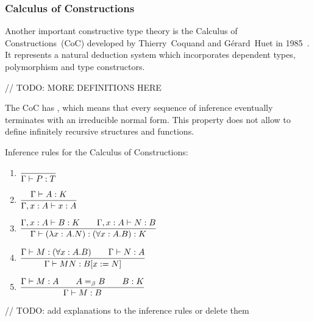 \documentclass[article]{aaltoseries}
\begin{document}
\subsubsection{Calculus of Constructions}

Another important constructive type theory is the Calculus of Constructions~(CoC) developed by Thierry~Coquand and Gérard~Huet in 1985~\cite{Coq85}. It represents a natural deduction system which incorporates dependent types, polymorphism and type constructors.

// TODO: MORE DEFINITIONS HERE


The CoC has , which means that every sequence of inference eventually terminates with an irreducible normal form. This property does not allow to define infinitely recursive structures and functions. %

Inference rules for the Calculus of Constructions:
\begin{enumerate}
	\item ${\displaystyle {{} \over {}\Gamma \vdash P:T}}$
	\item ${\displaystyle {\Gamma \vdash A:K \over {\Gamma ,x:A\vdash x:A}}}$
	\item ${\displaystyle {\Gamma ,x:A\vdash B:K\qquad \Gamma ,x:A\vdash N:B \over {\Gamma \vdash (\lambda x:A.N):(\forall x:A.B):K}}}$
	\item ${\displaystyle {\Gamma \vdash M:(\forall x:A.B)\qquad \Gamma \vdash N:A \over {\Gamma \vdash MN:B[x:=N]}}}$
	\item ${\displaystyle {\Gamma \vdash M:A\qquad A=_{\beta }B\qquad B:K \over {\Gamma \vdash M:B}}}$ %
\end{enumerate}

// TODO: add explanations to the inference rules or delete them
\end{document}
